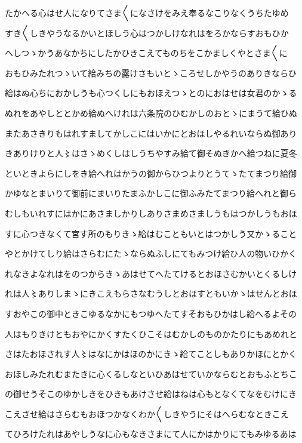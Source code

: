 \documentclass[a4paper,11pt,landscape]{ltjtarticle}
\begin{document}
たかへる心はせ人になりてさま〱になさけをみえ奉るなこりなくうちたゆめ
\par\medskip
すき〱しきやうなるかいとほしう心はつかしけなれはをろかならすおもひか
\par\medskip
へしつゝかうあなかちにしたかひきこえてものちをこかましくやとさま〱に
\par\medskip
おもひみたれつゝいて給みちの露けさもいとゝころせしかやうのありきならひ
\par\medskip
給はぬ心ちにおかしうも心つくしにもおほえつゝとのにおはせは女君のかゝる
\par\medskip
ぬれをあやしととかめ給ぬへけれは六条院のひむかしのおとゝにまうて給ひぬ
\par\medskip
またあさきりもはれすましてかしこにはいかにとおほしやるれいならぬ御あり
\par\medskip
きありけりと人〻はさゝめくしはしうちやすみ給て御そぬきかへ給つねに夏冬
\par\medskip
といときよらにしをき給へれはかうの御からひつよりとうてゝたてまつり給御
\par\medskip
かゆなとまいりて御前にまいりたまふかしこに御ふみたてまつり給へれと御ら
\par\medskip
むしもいれすにはかにあさましかりしありさまめさましうもはつかしうもおほ
\par\medskip
すに心つきなくて宮す所のもりきゝ給はむこともいとはつかしう又かゝること
\par\medskip
やとかけてしり給はさらむにたゝならぬふしにてもみつけ給ひ人の物いひかく
\par\medskip
れなきよなれはをのつからきゝあはせてへたてけるとおほさむかいとくるしけ
\par\medskip
れは人〻ありしまゝにきこえもらさなむうしとおほすともいかゝはせんとおほ
\par\medskip
すおやこの御中ときこゆるなかにもつゆへたてすそおもひかはし給へるよその
\par\medskip
人はもりきけともおやにかくすたくひこそはむかしのものかたりにもあめれと
\par\medskip
さはたおほされす人〻はなにかはほのかにきゝ給てことしもありかほにとかく
\par\medskip
おほしみたれむまたきに心くるしなといひあはせていかならむとおもふとちこ
\par\medskip
の御せうそこのゆかしきをひきもあけさせ給はねは心もとなくてなをむけにき
\par\medskip
こえさせ給はさらむもおほつかなくわか〱しきやうにそはへらむなときこえ
\par\medskip
てひろけたれはあやしうなに心もなきさまにて人にかはかりにてもみゆるあは
\end{document}

